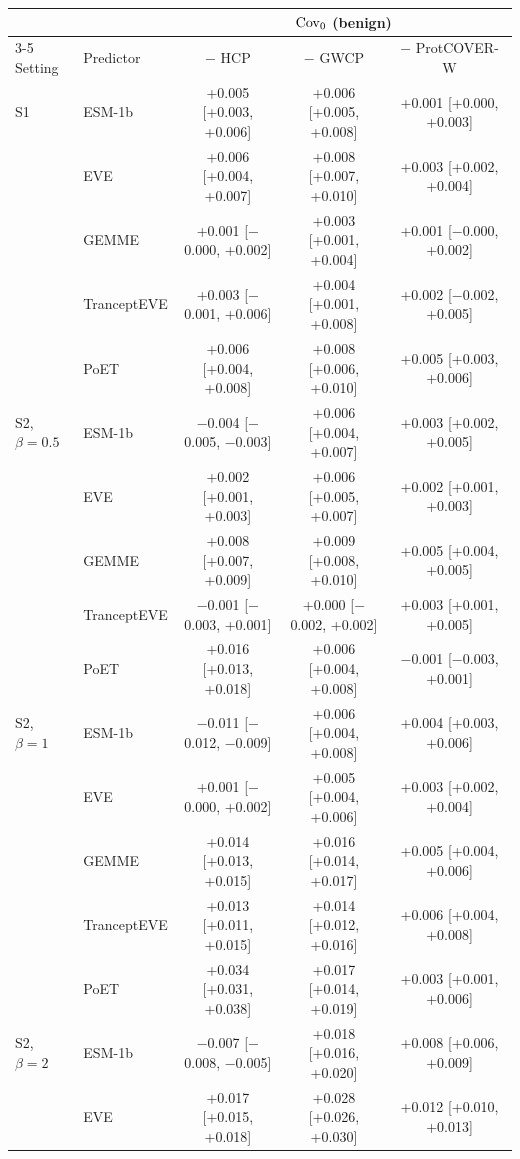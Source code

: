 \begin{tabular}{llccc}
\toprule
 & & \multicolumn{3}{c}{$\mathrm{Cov}_0$ (benign)} \\
\cmidrule(lr){3-5}
Setting & Predictor & $-$ HCP & $-$ GWCP & $-$ ProtCOVER-W \\
\midrule
S1 & ESM-1b & +0.005 [+0.003, +0.006] & +0.006 [+0.005, +0.008] & +0.001 [+0.000, +0.003] \\
 & EVE & +0.006 [+0.004, +0.007] & +0.008 [+0.007, +0.010] & +0.003 [+0.002, +0.004] \\
 & GEMME & +0.001 [$-$0.000, +0.002] & +0.003 [+0.001, +0.004] & +0.001 [$-$0.000, +0.002] \\
 & TranceptEVE & +0.003 [$-$0.001, +0.006] & +0.004 [+0.001, +0.008] & +0.002 [$-$0.002, +0.005] \\
 & PoET & +0.006 [+0.004, +0.008] & +0.008 [+0.006, +0.010] & +0.005 [+0.003, +0.006] \\
\midrule
S2, $\beta=0.5$ & ESM-1b & $-$0.004 [$-$0.005, $-$0.003] & +0.006 [+0.004, +0.007] & +0.003 [+0.002, +0.005] \\
 & EVE & +0.002 [+0.001, +0.003] & +0.006 [+0.005, +0.007] & +0.002 [+0.001, +0.003] \\
 & GEMME & +0.008 [+0.007, +0.009] & +0.009 [+0.008, +0.010] & +0.005 [+0.004, +0.005] \\
 & TranceptEVE & $-$0.001 [$-$0.003, +0.001] & +0.000 [$-$0.002, +0.002] & +0.003 [+0.001, +0.005] \\
 & PoET & +0.016 [+0.013, +0.018] & +0.006 [+0.004, +0.008] & $-$0.001 [$-$0.003, +0.001] \\
\midrule
S2, $\beta=1$ & ESM-1b & $-$0.011 [$-$0.012, $-$0.009] & +0.006 [+0.004, +0.008] & +0.004 [+0.003, +0.006] \\
 & EVE & +0.001 [$-$0.000, +0.002] & +0.005 [+0.004, +0.006] & +0.003 [+0.002, +0.004] \\
 & GEMME & +0.014 [+0.013, +0.015] & +0.016 [+0.014, +0.017] & +0.005 [+0.004, +0.006] \\
 & TranceptEVE & +0.013 [+0.011, +0.015] & +0.014 [+0.012, +0.016] & +0.006 [+0.004, +0.008] \\
 & PoET & +0.034 [+0.031, +0.038] & +0.017 [+0.014, +0.019] & +0.003 [+0.001, +0.006] \\
\midrule
S2, $\beta=2$ & ESM-1b & $-$0.007 [$-$0.008, $-$0.005] & +0.018 [+0.016, +0.020] & +0.008 [+0.006, +0.009] \\
 & EVE & +0.017 [+0.015, +0.018] & +0.028 [+0.026, +0.030] & +0.012 [+0.010, +0.013] \\

\end{tabular}
